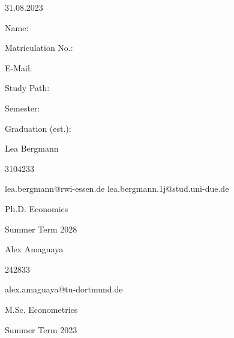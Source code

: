 \documentclass[11pt,a4paper]{article}
\begin{document}
\begin{titlepage}
  \noindent\begin{minipage}[t]{0.3\textwidth}
  \end{minipage}
  \begin{minipage}[t]{0.7\textwidth}
  \hspace{1cm}
  \end{minipage}

  \noindent\begin{minipage}[t]{0.3\textwidth}
  \end{minipage}
  \begin{minipage}[t]{0.7\textwidth}
  \hspace{1cm}31.08.2023
  \end{minipage}

  \hrulefill

  \begin{multicols}{3}

  Name:

  Matriculation No.:

  E-Mail:

  Study Path:

  Semester:

  Graduation (est.):

  \columnbreak

 Lea Bergmann

  3104233

lea.bergmann@rwi-essen.de
lea.bergmann.1j@stud.uni-due.de

Ph.D. Economics


  Summer Term 2028

  \columnbreak

  Alex Amaguaya

  242833

  alex.amaguaya@tu-dortmund.de

  M.Sc. Econometrics


  Summer Term 2023


  \end{multicols}

\end{titlepage}



{
\hypersetup{linkcolor=black}

\setcounter{tocdepth}{3}
\tableofcontents
}
\end{document}
